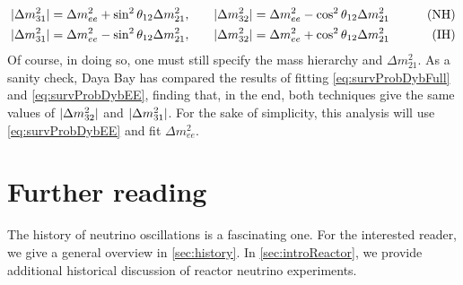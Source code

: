 \documentclass[../thesis.tex]{subfiles}
\begin{document}
\begin{align*}
  \lvert \Delta m^2_{31}\rvert = \Delta m^2_{ee} + \sin^2 \theta_{12} \Delta m^2_{21}, \qquad
  & \lvert \Delta m^2_{32}\rvert = \Delta m^2_{ee} - \cos^2 \theta_{12} \Delta m^2_{21} \qquad
  & \text{(NH)}\\
  \lvert \Delta m^2_{31}\rvert = \Delta m^2_{ee} - \sin^2 \theta_{12} \Delta m^2_{21}, \qquad
  & \lvert \Delta m^2_{32}\rvert = \Delta m^2_{ee} + \cos^2 \theta_{12} \Delta m^2_{21} \qquad
  & \text{(IH)}
\end{align*}
Of course, in doing so, one must still specify the mass hierarchy and \(\Delta m^2_{21}.\) As a sanity check, Daya Bay has compared the results of fitting \eqref{eq:survProbDybFull} and \eqref{eq:survProbDybEE}, finding that, in the end, both techniques give the same values of \(\lvert \Delta m^2_{32}\rvert\) and \(\lvert \Delta m^2_{31}\rvert\). For the sake of simplicity, this analysis will use \eqref{eq:survProbDybEE} and fit \(\Delta m^2_{ee}\).

\section{Further reading}
\label{sec:introFurther}

The history of neutrino oscillations is a fascinating one. For the interested reader, we give a general overview in \autoref{sec:history}. In \autoref{sec:introReactor}, we provide additional historical discussion of reactor neutrino experiments.

\subfilebackmatter
\end{document}
